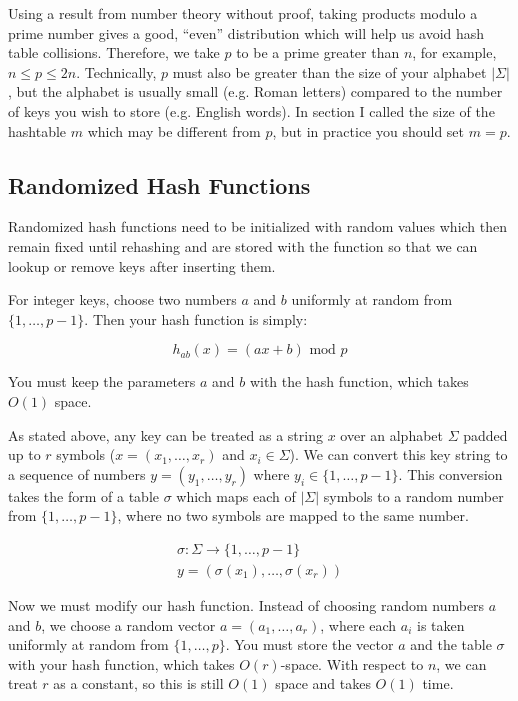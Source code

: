 \documentclass{article}[10pth]
\begin{document}
Using a result from number theory without proof, taking products modulo a
prime number gives a good, ``even'' distribution which will help us avoid
hash table collisions. Therefore, we take $p$ to be a prime greater than
$n$, for example, $n \le p \le 2n$. Technically, $p$ must also be greater than
the size of your alphabet $|\Sigma|$, but the alphabet is usually small
(e.g. Roman letters) compared to the number of keys you wish to store
(e.g. English words). In section I called the size of the
hashtable $m$ which may be different from $p$, but in practice you should 
set $m=p$.

\subsection{Randomized Hash Functions}

Randomized hash functions need to be initialized with random values which
then remain fixed until rehashing and are stored with the function so that
we can lookup or remove keys after inserting them.

For integer keys, choose two numbers $a$ and $b$ uniformly at random
from $\{1, \ldots, p-1\}$. Then your hash function is simply:

\begin{equation}
h_{ab}(x) = (ax + b) \textrm{ mod } p
\end{equation}

You must keep the parameters $a$ and $b$ with the hash function, which
takes $O(1)$ space.

As stated above, any key can be treated as a string $x$ over
an alphabet $\Sigma$
padded up to $r$ symbols ($x = (x_1, \ldots, x_r)$ and $x_i \in \Sigma$).
 We can convert this key string to a sequence of
numbers
$y = (y_1, \ldots, y_r)$ where $y_i \in \{1, \ldots, p-1\}$.
This conversion takes the form of a table $\sigma$ which maps
each of $|\Sigma|$ symbols to a random number
from $\{1, \ldots, p-1\}$, where no two symbols are mapped to the same
number.

\begin{eqnarray}
\sigma : \Sigma \rightarrow \{1, \ldots, p-1\}\\
y = (\sigma(x_1), \ldots, \sigma(x_r))
\end{eqnarray}

Now we must modify our hash function. Instead of choosing random numbers
$a$ and $b$, we choose a
random vector $a = (a_1, \ldots, a_r)$, where each $a_i$ is taken
uniformly at random from $\{1, \ldots, p\}$.
You must store the vector $a$ and the table $\sigma$ with your hash function,
which takes $O(r)$-space. With respect to $n$, we can treat $r$ as a constant,
so this is still $O(1)$ space and takes $O(1)$ time.
\end{document}
